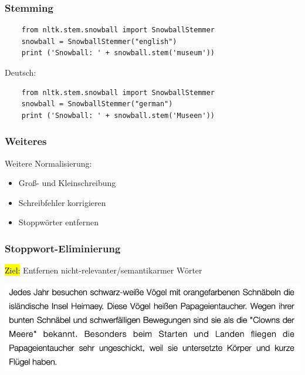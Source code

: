     
\begin{frame}[fragile]
    \frametitle{Stemming}

    \begin{verbatim}
    from nltk.stem.snowball import SnowballStemmer
    snowball = SnowballStemmer("english")
    print ('Snowball: ' + snowball.stem('museum'))
    \end{verbatim}

    Deutsch:
    \begin{verbatim}
    from nltk.stem.snowball import SnowballStemmer
    snowball = SnowballStemmer("german")
    print ('Snowball: ' + snowball.stem('Museen'))
    \end{verbatim}
    \end{frame}
    
    
    \begin{frame}
    \frametitle{Weiteres}
    Weitere Normalisierung:

    \begin{itemize}
    \item Groß- und Kleinschreibung
    \item Schreibfehler korrigieren
    \item Stoppwörter entfernen
    \end{itemize}
\end{frame}
     
\begin{frame}
    \frametitle{Stoppwort-Eliminierung}

    \hl{Ziel:} Entfernen nicht-relevanter/semantikarmer Wörter

    \centering\includegraphics[width=\textwidth]{fig8/stopwords_example1}

\end{frame}
     
